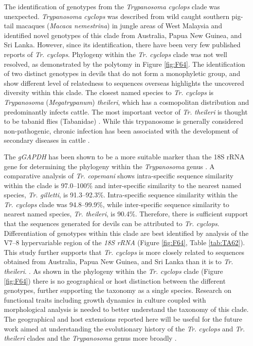 \documentclass[a4paper, nobind]{templates/ociamthesis}
\begin{document}
The identification of genotypes from the \emph{Trypanosoma cyclops} clade was unexpected. \emph{Trypanosoma cyclops} was described from wild caught southern pig-tail macaques (\emph{Macaca nemestrina}) in jungle areas of West Malaysia \autocite{weinmanTrypanosomaCyclopsSp1972} and \textcite{hamiltonNewLineageTrypanosomes2005} identified novel genotypes of this clade from Australia, Papua New Guinea, and Sri Lanka. However, since its identification, there have been very few published reports of \emph{Tr. cyclops}. Phylogeny within the \emph{Tr. cyclops} clade was not well resolved, as demonstrated by the polytomy in Figure \ref{fig:F64}. The identification of two distinct genotypes in devils that do not form a monophyletic group, and show different level of relatedness to sequences overseas highlights the uncovered diversity within this clade. The closest named species to \emph{Tr. cyclops} is \emph{Trypanosoma} (\emph{Megatrypanum}) \emph{theileri}, which has a cosmopolitan distribution and predominantly infects cattle. The most important vector of \emph{Tr. theileri} is thought to be tabanid flies (Tabanidae) \autocite{hoareTrypanosomesMammalsZoological1972,werszkoMolecularDetectionMegatrypanum2020}. While this trypanosome is generally considered non-pathogenic, chronic infection has been associated with the development of secondary diseases in cattle \autocite{rodriguesCharacterizationSplicedLeader2010}.

The \emph{gGAPDH} has been shown to be a more suitable marker than the 18S rRNA gene for determining the phylogeny within the \emph{Trypanosoma} genus \autocite{hamiltonTrypanosomesAreMonophyletic2004}. A comparative analysis of \emph{Tr. copemani} shows intra-specific sequence similarity within the clade is 97.0--100\% and inter-specific similarity to the nearest named species, \emph{Tr. gilletti}, is 91.3--92.3\%. Intra-specific sequence similarity within the \emph{Tr. cyclops} clade was 94.8--99.9\%, while inter-specific sequence similarity to nearest named species, \emph{Tr. theileri}, is 90.4\%. Therefore, there is sufficient support that the sequences generated for devils can be attributed to \emph{Tr. cyclops}. Differentiation of genotypes within this clade are best identified by analysis of the V7--8 hypervariable region of the \emph{18S rRNA} (Figure \ref{fig:F64}, Table \ref{tab:TA62}). This study further supports that \emph{Tr. cyclops} is more closely related to sequences obtained from Australia, Papua New Guinea, and Sri Lanka than it is to \emph{Tr. theileri}. \autocite{hamiltonNewLineageTrypanosomes2005}. As shown in the phylogeny within the \emph{Tr. cyclops} clade (Figure \ref{fig:F64}) there is no geographical or host distinction between the different genotypes, further supporting the taxonomy as a single species. Research on functional traits including growth dynamics in culture coupled with morphological analysis is needed to better understand the taxonomy of this clade. The geographical and host extensions reported here will be useful for the future work aimed at understanding the evolutionary history of the \emph{Tr. cyclops} and \emph{Tr. theileri} clades and the \emph{Trypanosoma} genus more broadly \autocite{hamiltonEvolutionTrypanosomaCruzi2012}.
\end{document}
